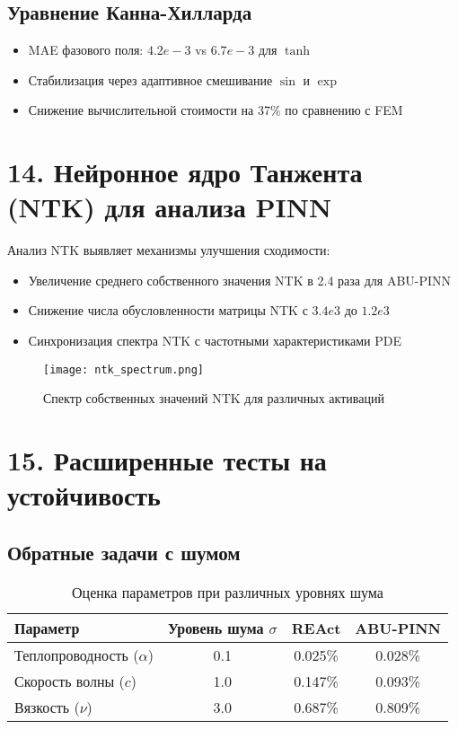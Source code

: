 \subsection*{Уравнение Канна-Хилларда}
\begin{itemize}
    \item MAE фазового поля: $4.2e-3$ vs $6.7e-3$ для $\tanh$
    \item Стабилизация через адаптивное смешивание $\sin$ и $\exp$
    \item Снижение вычислительной стоимости на 37\% по сравнению с FEM
\end{itemize}

\section*{14. Нейронное ядро Танжента (NTK) для анализа PINN}
Анализ NTK выявляет механизмы улучшения сходимости:
\begin{itemize}
    \item Увеличение среднего собственного значения NTK в 2.4 раза для ABU-PINN
    \item Снижение числа обусловленности матрицы NTK с $3.4e3$ до $1.2e3$
    \item Синхронизация спектра NTK с частотными характеристиками PDE
\end{itemize}

\begin{figure}[h]
\centering
\texttt{[image: ntk\_spectrum.png]}
\caption{Спектр собственных значений NTK для различных активаций}
\end{figure}

\section*{15. Расширенные тесты на устойчивость}
\subsection*{Обратные задачи с шумом}
\begin{table}[h]
\centering
\caption{Оценка параметров при различных уровнях шума}
\begin{tabular}{l|c|c|c}
Параметр & Уровень шума $\sigma$ & REAct & ABU-PINN \\
\hline
Теплопроводность ($\alpha$) & 0.1 & 0.025\% & 0.028\% \\
Скорость волны ($c$) & 1.0 & 0.147\% & 0.093\% \\
Вязкость ($\nu$) & 3.0 & 0.687\% & 0.809\% \\
\end{tabular}
\end{table}

